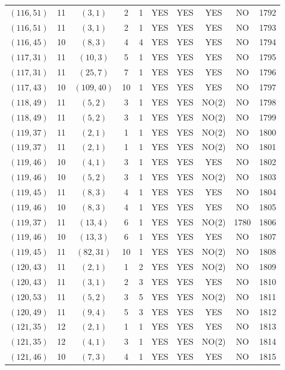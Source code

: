 \begin{longtable}{|c|c|c|c|c|c|c|c|c|c|}
$(116, 51)$ & 11 & $(3, 1)$ & 2 & 1 & YES & YES & YES & NO & 1792\\
$(116, 51)$ & 11 & $(3, 1)$ & 2 & 1 & YES & YES & YES & NO & 1793\\
$(116, 45)$ & 10 & $(8, 3)$ & 4 & 4 & YES & YES & YES & NO & 1794\\
$(117, 31)$ & 11 & $(10, 3)$ & 5 & 1 & YES & YES & YES & NO & 1795\\
$(117, 31)$ & 11 & $(25, 7)$ & 7 & 1 & YES & YES & YES & NO & 1796\\
$(117, 43)$ & 10 & $(109, 40)$ & 10 & 1 & YES & YES & YES & NO & 1797\\
$(118, 49)$ & 11 & $(5, 2)$ & 3 & 1 & YES & YES & NO(2) & NO & 1798\\
$(118, 49)$ & 11 & $(5, 2)$ & 3 & 1 & YES & YES & NO(2) & NO & 1799\\
$(119, 37)$ & 11 & $(2, 1)$ & 1 & 1 & YES & YES & NO(2) & NO & 1800\\
$(119, 37)$ & 11 & $(2, 1)$ & 1 & 1 & YES & YES & NO(2) & NO & 1801\\
$(119, 46)$ & 10 & $(4, 1)$ & 3 & 1 & YES & YES & YES & NO & 1802\\
$(119, 46)$ & 10 & $(5, 2)$ & 3 & 1 & YES & YES & NO(2) & NO & 1803\\
$(119, 45)$ & 11 & $(8, 3)$ & 4 & 1 & YES & YES & YES & NO & 1804\\
$(119, 46)$ & 10 & $(8, 3)$ & 4 & 1 & YES & YES & YES & NO & 1805\\
$(119, 37)$ & 11 & $(13, 4)$ & 6 & 1 & YES & YES & NO(2) & 1780 & 1806\\
$(119, 46)$ & 10 & $(13, 3)$ & 6 & 1 & YES & YES & YES & NO & 1807\\
$(119, 45)$ & 11 & $(82, 31)$ & 10 & 1 & YES & YES & NO(2) & NO & 1808\\
$(120, 43)$ & 11 & $(2, 1)$ & 1 & 2 & YES & YES & NO(2) & NO & 1809\\
$(120, 43)$ & 11 & $(3, 1)$ & 2 & 3 & YES & YES & YES & NO & 1810\\
$(120, 53)$ & 11 & $(5, 2)$ & 3 & 5 & YES & YES & NO(2) & NO & 1811\\
$(120, 49)$ & 11 & $(9, 4)$ & 5 & 3 & YES & YES & YES & NO & 1812\\
$(121, 35)$ & 12 & $(2, 1)$ & 1 & 1 & YES & YES & YES & NO & 1813\\
$(121, 35)$ & 12 & $(4, 1)$ & 3 & 1 & YES & YES & NO(2) & NO & 1814\\
$(121, 46)$ & 10 & $(7, 3)$ & 4 & 1 & YES & YES & YES & NO & 1815\\

\end{longtable}
